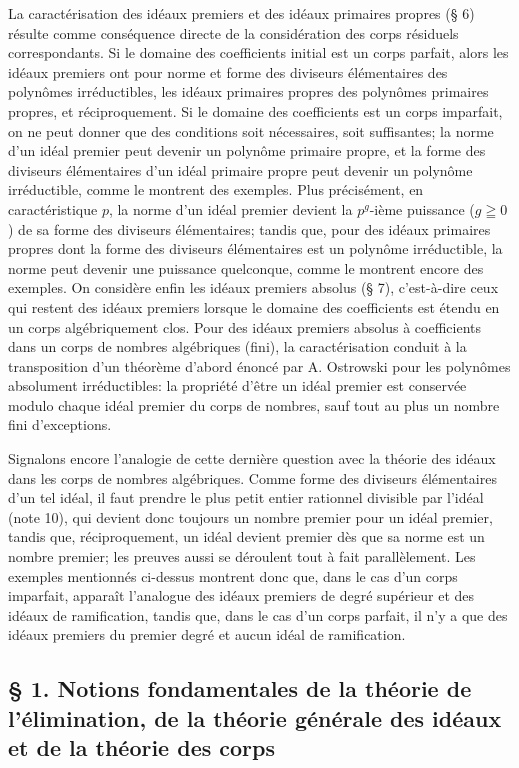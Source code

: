 La caractérisation des idéaux premiers et des idéaux primaires propres (\S{} 6) résulte comme conséquence directe de la considération des corps résiduels correspondants. Si le domaine des coefficients initial est un corps parfait, alors les idéaux premiers ont pour norme et forme des diviseurs élémentaires des polynômes irréductibles, les idéaux primaires propres des polynômes primaires propres, et réciproquement. Si le domaine des coefficients est un corps imparfait, on ne peut donner que des conditions soit nécessaires, soit suffisantes; la norme d'un idéal premier peut devenir un polynôme primaire propre, et la forme des diviseurs élémentaires d'un idéal primaire propre peut devenir un polynôme irréductible, comme le montrent des exemples. Plus précisément, en caractéristique $p$, la norme d'un idéal premier devient la $p^g$-ième puissance ($g\geqq0$) de sa forme des diviseurs élémentaires; tandis que, pour des idéaux primaires propres dont la forme des diviseurs élémentaires est un polynôme irréductible, la norme peut devenir une puissance quelconque, comme le montrent encore des exemples. On considère enfin les idéaux premiers absolus (\S{} 7), c'est-à-dire ceux qui restent des idéaux premiers lorsque le domaine des coefficients est étendu en un corps algébriquement clos. Pour des idéaux premiers absolus à coefficients dans un corps de nombres algébriques (fini), la caractérisation conduit à la transposition d'un théorème d'abord énoncé par A. Ostrowski pour les polynômes absolument irréductibles: la propriété d'être un idéal premier est conservée modulo chaque idéal premier du corps de nombres, sauf tout au plus un nombre fini d'exceptions.

Signalons encore l'analogie de cette dernière question avec la théorie des idéaux dans les corps de nombres algébriques. Comme forme des diviseurs élémentaires d'un tel idéal, il faut prendre le plus petit entier rationnel divisible par l'idéal (note 10), qui devient donc toujours un nombre premier pour un idéal premier, tandis que, réciproquement, un idéal devient premier dès que sa norme est un nombre premier; les preuves aussi se déroulent tout à fait parallèlement. Les exemples mentionnés ci-dessus montrent donc que, dans le cas d'un corps imparfait, apparaît l'analogue des idéaux premiers de degré supérieur et des idéaux de ramification, tandis que, dans le cas d'un corps parfait, il n'y a que des idéaux premiers du premier degré et aucun idéal de ramification.

\subsection*{\S{} 1. Notions fondamentales de la théorie de l'élimination, de la théorie générale des idéaux et de la théorie des corps}

